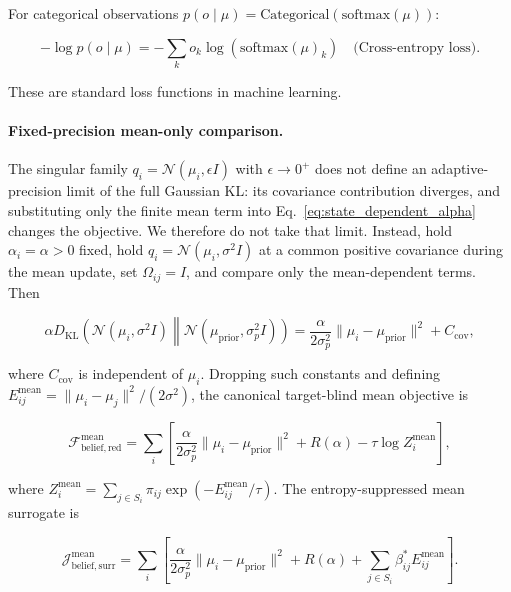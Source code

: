 \documentclass[twoside,11pt]{article}
\begin{document}
For categorical observations $p(o \mid \mu) = \mathrm{Categorical}(\mathrm{softmax}(\mu))$:

\begin{equation}
-\log p(o \mid \mu) = -\sum_k o_k \log(\mathrm{softmax}(\mu)_k) \quad \text{(Cross-entropy loss)}.
\end{equation}

These are standard loss functions in machine learning.


\paragraph{Fixed-precision mean-only comparison.}

The singular family $q_i=\mathcal{N}(\mu_i,\epsilon I)$ with $\epsilon\to0^+$ does not define an adaptive-precision limit of the full Gaussian KL: its covariance contribution diverges, and substituting only the finite mean term into Eq.~\eqref{eq:state_dependent_alpha} changes the objective. We therefore do not take that limit. Instead, hold $\alpha_i=\alpha>0$ fixed, hold $q_i=\mathcal{N}(\mu_i,\sigma^2I)$ at a common positive covariance during the mean update, set $\Omega_{ij}=I$, and compare only the mean-dependent terms. Then

\begin{equation}
\alpha D_{\mathrm{KL}}
\left(
\mathcal{N}(\mu_i,\sigma^2I)
\middle\|
\mathcal{N}(\mu_{\mathrm{prior}},\sigma_p^2I)
\right)
=\frac{\alpha}{2\sigma_p^2}
\|\mu_i-\mu_{\mathrm{prior}}\|^2+C_{\mathrm{cov}},
\label{eq:alpha_i_deterministic}
\end{equation}

where $C_{\mathrm{cov}}$ is independent of $\mu_i$. Dropping such constants and defining $E_{ij}^{\mathrm{mean}}=\|\mu_i-\mu_j\|^2/(2\sigma^2)$, the canonical target-blind mean objective is

\begin{equation}
\mathcal{F}_{\mathrm{belief,red}}^{\mathrm{mean}}
=\sum_i\left[
\frac{\alpha}{2\sigma_p^2}\|\mu_i-\mu_{\mathrm{prior}}\|^2
+R(\alpha)-\tau\log Z_i^{\mathrm{mean}}
\right],
\label{eq:deterministic_free_energy_adaptive}
\end{equation}

where $Z_i^{\mathrm{mean}}=\sum_{j\in S_i}\pi_{ij}\exp(-E_{ij}^{\mathrm{mean}}/\tau)$. The entropy-suppressed mean surrogate is

\begin{equation}
\mathcal{J}_{\mathrm{belief,surr}}^{\mathrm{mean}}
=\sum_i\left[
\frac{\alpha}{2\sigma_p^2}\|\mu_i-\mu_{\mathrm{prior}}\|^2
+R(\alpha)
+\sum_{j\in S_i}\beta_{ij}^*E_{ij}^{\mathrm{mean}}
\right].
\label{eq:deterministic_free_energy_standard}
\end{equation}
\end{document}
